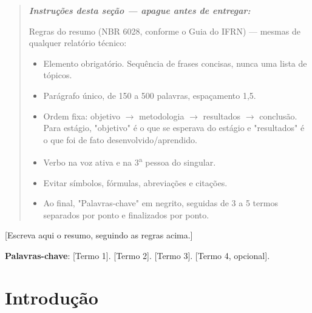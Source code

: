 \documentclass[article,12pt,a4paper,oneside]{abntex2}
\newenvironment{instrucoes}{%
  \begin{quotation}\footnotesize\itshape
  \noindent\textbf{\upshape Instruções desta seção — apague antes de entregar:}\par\smallskip
}{%
  \end{quotation}
}
\begin{document}
\maketitle

\begin{resumo}
\begin{instrucoes}
Regras do resumo (NBR 6028, conforme o Guia do IFRN) — mesmas de qualquer relatório técnico:
\begin{itemize}
  \item Elemento obrigatório. Sequência de frases concisas, nunca uma lista de tópicos.
  \item Parágrafo único, de 150 a 500 palavras, espaçamento 1,5.
  \item Ordem fixa: objetivo $\to$ metodologia $\to$ resultados $\to$ conclusão. Para estágio, "objetivo" é o que se esperava do estágio e "resultados" é o que foi de fato desenvolvido/aprendido.
  \item Verbo na voz ativa e na 3\textsuperscript{a} pessoa do singular.
  \item Evitar símbolos, fórmulas, abreviações e citações.
  \item Ao final, "Palavras-chave" em negrito, seguidas de 3 a 5 termos separados por ponto e finalizados por ponto.
\end{itemize}
\end{instrucoes}

[Escreva aqui o resumo, seguindo as regras acima.]

\vspace{\onelineskip}
\noindent
\textbf{Palavras-chave}: [Termo 1]. [Termo 2]. [Termo 3]. [Termo 4, opcional].
\end{resumo}

\textual

\section{Introdução}
\end{document}
